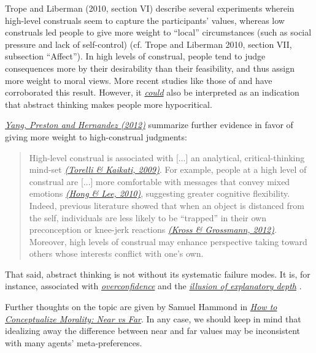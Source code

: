 Trope and Liberman (2010, section VI) describe several experiments
wherein high-level construals seem to capture the participants' values,
whereas low construals led people to give more weight to ``local''
circumstances (such as social pressure and lack of self-control) (cf.
Trope and Liberman 2010, section VII, subsection ``Affect''). In high
levels of construal, people tend to judge consequences more by their
desirability than their feasibility, and thus assign more weight to
moral views. More recent studies like those of
\parencite{Torelli2009-mw} and
\parencite{Agerstrom2013-ep} have corroborated this result.
However, it
\href{http://www.overcomingbias.com/2010/05/far-is-hypocritical.html}{\emph{could}}
also be interpreted as an indication that abstract thinking makes people
more hypocritical.

\href{http://minerva.union.edu/bizerg/readings230/wk04.pdf}{\emph{Yang,
Preston and Hernandez (2012)}} summarize further evidence in favor of
giving more weight to high-construal judgments:

\begin{quote}
High-level construal is associated with {[}...{]} an analytical,
critical-thinking mind-set
\href{http://citeseerx.ist.psu.edu/viewdoc/download?doi=10.1.1.186.6465\&rep=rep1\&type=pdf}{\emph{(Torelli
\& Kaikati, 2009)}}. For example, people at a high level of construal
are {[}...{]} more comfortable with messages that convey mixed emotions
\href{http://www.bm.ust.hk/mark/staff/Jiewen/Jiewen\%20JCR-Oct\%202010.pdf}{\emph{(Hong
\& Lee, 2010)}}, suggesting greater cognitive flexibility. Indeed,
previous literature showed that when an object is distanced from the
self, individuals are less likely to be ``trapped'' in their own
preconception or knee-jerk reactions
\href{https://uwaterloo.ca/wisdom-and-culture-lab/sites/ca.wisdom-and-culture-lab/files/uploads/files/kross_grossmann_jepg_2012.pdf}{\emph{(Kross
\& Grossmann, 2012)}}. Moreover, high levels of construal may enhance
perspective taking toward others whose interests conflict with one's
own.
\end{quote}

That said, abstract thinking is not without its systematic failure
modes. It is, for instance, associated with
\href{https://en.wikipedia.org/wiki/Overconfidence_effect}{\emph{overconfidence}}
and the \href{https://www.edge.org/response-detail/27117}{\emph{illusion
of explanatory depth}} \parencite{Alter2010-lu}.

Further thoughts on the topic are given by Samuel Hammond in
\href{http://abstractminutiae.com/post/85550239565/how-to-conceptualize-morality-near-vs-far}{\emph{\emph{How
to Conceptualize Morality: Near vs Far}}}. In any case, we should keep
in mind that idealizing away the difference between near and far values
may be inconsistent with many agents' meta-preferences.

